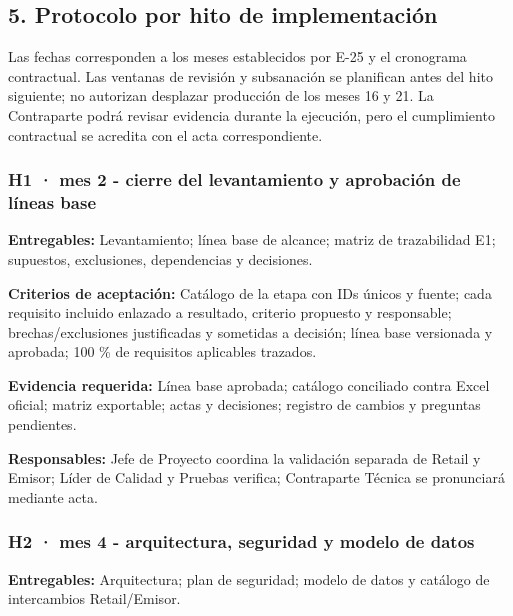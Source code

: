 \documentclass[11pt]{article}
\begin{document}
\subsection{5. Protocolo por hito de implementación}\label{t17-protocolo-por-hito-de-implementaciuxf3n}

Las fechas corresponden a los meses establecidos por E-25 y el cronograma contractual. Las ventanas de revisión y subsanación se planifican antes del hito siguiente; no autorizan desplazar producción de los meses 16 y 21. La Contraparte podrá revisar evidencia durante la ejecución, pero el cumplimiento contractual se acredita con el acta correspondiente.

\subsubsection{\texorpdfstring{\textbf{H1 · mes 2} - cierre del levantamiento y aprobación de líneas base}{H1 · mes 2 - cierre del levantamiento y aprobación de líneas base}}\label{t17-h1-mes-2-cierre-del-levantamiento-y-aprobaciuxf3n-de-luxedneas-base}

\textbf{Entregables:} Levantamiento; línea base de alcance; matriz de trazabilidad E1; supuestos, exclusiones, dependencias y decisiones.

\textbf{Criterios de aceptación:} Catálogo de la etapa con IDs únicos y fuente; cada requisito incluido enlazado a resultado, criterio propuesto y responsable; brechas/exclusiones justificadas y sometidas a decisión; línea base versionada y aprobada; 100 \% de requisitos aplicables trazados.

\textbf{Evidencia requerida:} Línea base aprobada; catálogo conciliado contra Excel oficial; matriz exportable; actas y decisiones; registro de cambios y preguntas pendientes.

\textbf{Responsables:} Jefe de Proyecto coordina la validación separada de Retail y Emisor; Líder de Calidad y Pruebas verifica; Contraparte Técnica se pronunciará mediante acta.

\subsubsection{\texorpdfstring{\textbf{H2 · mes 4} - arquitectura, seguridad y modelo de datos}{H2 · mes 4 - arquitectura, seguridad y modelo de datos}}\label{t17-h2-mes-4-arquitectura-seguridad-y-modelo-de-datos}

\textbf{Entregables:} Arquitectura; plan de seguridad; modelo de datos y catálogo de intercambios Retail/Emisor.
\end{document}
